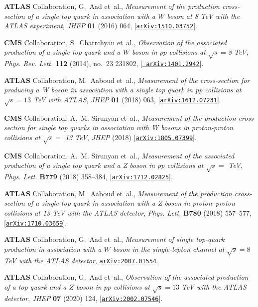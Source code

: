 \documentclass[11pt,a4paper]{article}
\numberwithin{equation}{section}
\numberwithin{figure}{section}
\numberwithin{table}{section}
\begin{document}
\begin{thebibliography}{100}
{\bf ATLAS} Collaboration, G.~Aad et~al., {\it {Measurement of the production
  cross-section of a single top quark in association with a $W$ boson at 8 TeV
  with the ATLAS experiment}},  {\em JHEP} {\bf 01} (2016) 064,
  [\href{http://arxiv.org/abs/1510.03752}{{\tt arXiv:1510.03752}}].

{\bf CMS} Collaboration, S.~Chatrchyan et~al., {\it {Observation of the
  associated production of a single top quark and a $W$ boson in $pp$
  collisions at $\sqrt s = $8 TeV}},  {\em Phys. Rev. Lett.} {\bf 112} (2014),
  no.~23 231802, [\href{http://arxiv.org/abs/1401.2942}{{\tt
  arXiv:1401.2942}}].

{\bf ATLAS} Collaboration, M.~Aaboud et~al., {\it {Measurement of the
  cross-section for producing a W boson in association with a single top quark
  in pp collisions at $ \sqrt{s}=13 $ TeV with ATLAS}},  {\em JHEP} {\bf 01}
  (2018) 063, [\href{http://arxiv.org/abs/1612.07231}{{\tt arXiv:1612.07231}}].

{\bf CMS} Collaboration, A.~M. Sirunyan et~al., {\it {Measurement of the
  production cross section for single top quarks in association with W bosons
  in proton-proton collisions at $\sqrt{s}=$ 13 TeV}},  {\em JHEP} (2018)
  [\href{http://arxiv.org/abs/1805.07399}{{\tt arXiv:1805.07399}}].

{\bf CMS} Collaboration, A.~M. Sirunyan et~al., {\it {Measurement of the
  associated production of a single top quark and a Z boson in pp collisions at
  $\sqrt{s} =$ TeV}},  {\em Phys. Lett.} {\bf B779} (2018) 358--384,
  [\href{http://arxiv.org/abs/1712.02825}{{\tt arXiv:1712.02825}}].

{\bf ATLAS} Collaboration, M.~Aaboud et~al., {\it {Measurement of the
  production cross-section of a single top quark in association with a Z boson
  in proton--proton collisions at 13 TeV with the ATLAS detector}},  {\em Phys.
  Lett.} {\bf B780} (2018) 557--577,
  [\href{http://arxiv.org/abs/1710.03659}{{\tt arXiv:1710.03659}}].

{\bf ATLAS} Collaboration, G.~Aad et~al., {\it {Measurement of single top-quark
  production in association with a $W$ boson in the single-lepton channel at
  $\sqrt{s} = 8$ TeV with the ATLAS detector}},
  \href{http://arxiv.org/abs/2007.01554}{{\tt arXiv:2007.01554}}.

{\bf ATLAS} Collaboration, G.~Aad et~al., {\it {Observation of the associated
  production of a top quark and a $Z$ boson in $pp$ collisions at $\sqrt{s} =
  13$ TeV with the ATLAS detector}},  {\em JHEP} {\bf 07} (2020) 124,
  [\href{http://arxiv.org/abs/2002.07546}{{\tt arXiv:2002.07546}}].


\end{thebibliography}
\end{document}
